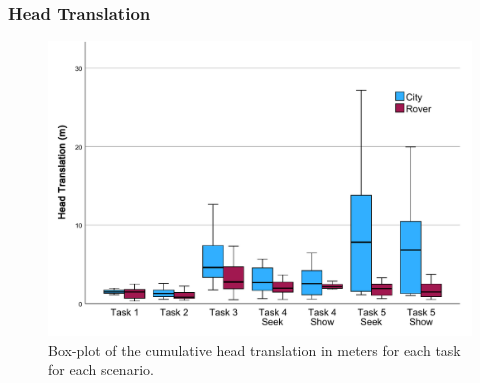         \subsubsection{Head Translation}


            \begin{figure}[h!]
                \centering
                \includegraphics[width=1\linewidth]{figures/head_graph.pdf}
                \caption{Box-plot of the cumulative head translation in meters for each task for each scenario.}
                \label{fig:task_time}
            \end{figure}

